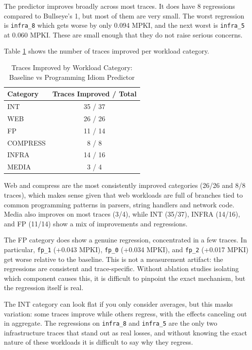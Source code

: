 \documentclass[11pt,a4paper]{article}
\begin{document}
The predictor improves broadly across most traces. It does have 8 regressions 
compared to Bullseye's 1, but most of them are very small. The worst regression 
is \texttt{infra\_8} which gets worse by only 0.094 MPKI, and the next worst 
is \texttt{infra\_5} at 0.060 MPKI. These are small enough that they do not 
raise serious concerns.

Table \ref{tab:mose_category} shows the number of traces improved per workload category.

\begin{table}[H]
\centering
\caption{Traces Improved by Workload Category: Baseline vs Programming Idiom Predictor}
\label{tab:mose_category}
\begin{tabular}{lc}
\toprule
\textbf{Category} & \textbf{Traces Improved / Total} \\
\midrule
INT      & 35 / 37 \\
WEB      & 26 / 26 \\
FP       & 11 / 14 \\
COMPRESS & 8 / 8 \\
INFRA    & 14 / 16 \\
MEDIA    & 3 / 4 \\
\bottomrule
\end{tabular}
\end{table}

Web and compress are the most consistently improved categories (26/26 and 8/8 traces),
which makes sense given that web workloads are full of branches tied to common
programming patterns in parsers, string handlers and network code. Media also improves
on most traces (3/4), while INT (35/37), INFRA (14/16), and FP (11/14) show a mix of
improvements and regressions.

The FP category does show a genuine regression, concentrated in a few traces.
In particular, \texttt{fp\_1} (+0.043 MPKI), \texttt{fp\_0} (+0.034 MPKI), and
\texttt{fp\_2} (+0.017 MPKI) get worse relative to the baseline. This is not a
measurement artifact: the regressions are consistent and trace-specific.
Without ablation studies isolating which component causes this, it is difficult
to pinpoint the exact mechanism, but the regression itself is real.

The INT category can look flat if you only consider averages, but this masks
variation: some traces improve while others regress, with the effects canceling
out in aggregate. The regressions on \texttt{infra\_8} and \texttt{infra\_5} are
the only two infrastructure traces that stand out as real losses, and without
knowing the exact nature of these workloads it is difficult to say why they
regress.
\end{document}
